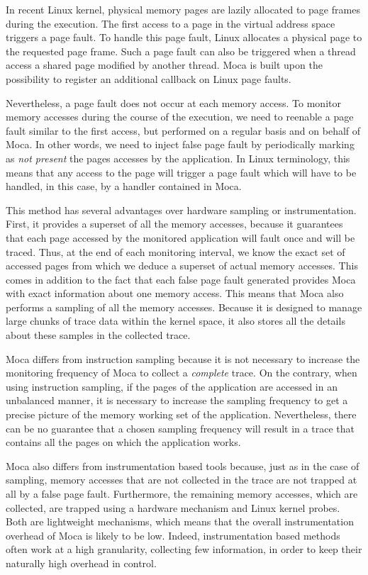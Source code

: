 In recent Linux kernel, physical memory pages are lazily allocated to page frames during the execution.
The first access to a page in the virtual address space triggers a page fault.
To handle this page fault, Linux allocates a physical page to the requested page frame.
Such a page fault can also be triggered when a thread access a shared page modified by another thread.
\gls{Moca} is built upon the possibility to register an additional callback on Linux page faults.

Nevertheless, a page fault does not occur at each memory access.
To monitor memory accesses during the course of the execution, we need to reenable a page fault similar to the first access, but performed on a regular basis and on behalf of \gls{Moca}.
In other words, we need to inject false page fault by periodically marking as \emph{not present} the pages accesses by the application.
In Linux terminology, this means that any access to the page will trigger a page fault which will have to be handled, in this case, by a handler contained in \gls{Moca}.

This method has several advantages over hardware sampling or instrumentation.
First, it provides a superset of all the memory accesses, because it guarantees that each page accessed by the monitored application will fault once and will be traced.
Thus, at the end of each monitoring interval, we know the exact set of accessed pages from which we deduce a superset of actual memory accesses.
This comes in addition to the fact that each false page fault generated provides \gls{Moca} with exact information about one memory access.
This means that \gls{Moca} also performs a sampling of all the memory accesses.
Because it is designed to manage large chunks of trace data within the kernel space, it also stores all the details about these samples in the collected trace.

\gls{Moca} differs from instruction sampling because it is not necessary to increase the monitoring frequency of \gls{Moca} to collect a \emph{complete} trace.
On the contrary, when using instruction sampling, if the pages of the application are accessed in an unbalanced manner, it is necessary to increase the sampling frequency to get a precise picture of the memory working set of the application.
Nevertheless, there can be no guarantee that a chosen sampling frequency will result in a trace that contains all the pages on which the application works.

\gls{Moca} also differs from instrumentation based tools because, just as in the case of sampling, memory accesses that are not collected in the trace are not trapped at all by a false page fault.
Furthermore, the remaining memory accesses, which are collected, are trapped using a hardware mechanism and Linux kernel probes.
Both are lightweight mechanisms, which means that the overall instrumentation overhead of \gls{Moca} is likely to be low.
Indeed, instrumentation based methods often work at a high granularity, collecting few information, in order to keep their naturally high overhead in control.

